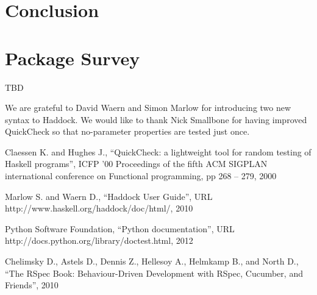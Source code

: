 \documentclass[preprint]{sigplanconf}
\begin{document}
\section{Conclusion}

\appendix

\section{Package Survey}

TBD

\acks

We are grateful to David Waern and Simon Marlow
for introducing two new syntax to Haddock.
We would like to thank
Nick Smallbone for having improved QuickCheck so that no-parameter properties are tested just once.






\begin{thebibliography}{}
\softraggedright

Claessen K. and Hughes J.,
``QuickCheck: a lightweight tool for random testing of Haskell programs'',
ICFP '00 Proceedings of the fifth ACM SIGPLAN international conference on Functional programming,
pp 268 -- 279,
2000

Marlow S. and Waern D.,
``Haddock User Guide'',
URL http://www.haskell.org/haddock/doc/html/,
2010

Python Software Foundation,
``Python documentation'',
URL http://docs.python.org/library/doctest.html,
2012

Chelimsky D.,
Astels D., Dennis Z., Hellesoy A., Helmkamp B., and North D.,
``The RSpec Book: Behaviour-Driven
Development with RSpec, Cucumber, and Friends'',
2010

\end{thebibliography}
\end{document}
